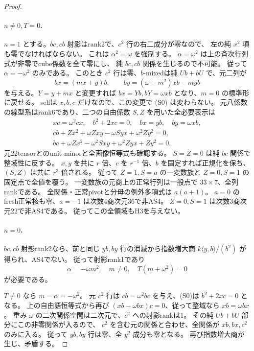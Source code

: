 \begin{proof}
\paragraph{$n\ne0,T=0$.}
$n=1$ とする。$bc,cb$ 射影はrank2で、$c^2$ 行の右二成分が零なので、
左の純 $x^2$ 項も零でなければならない。
これは $\alpha^2=\omega$ を強制する。
$\alpha=\omega^2$ は上の斉次行列式が非零でcube係数を全て零にし、
純 $bc,cb$ 関係を生じるので不可能。
従って $\alpha=-\omega^2$ のみである。
このとき $c^2$ 行は零、$b$-mixedは純 $Ub+bU$ で、元二列が
\[
 bx=(mx+y)b,\qquad by=(\omega-m^2)xb-myb
\]
を与える。$Y=y+mx$ と変更すれば $bx=Yb,bY=\omega xb$ となり、$m=0$ の標準形に戻せる。
selfは $x,b,c$ だけなので、この変更で (S0) は変わらない。
元八係数の線型系はrank6であり、二つの自由係数 $S,Z$ を用いた全必要表示は
\begin{gather*}
 xc=\omega^2cx,\quad b^2+2xc=0,\quad bx=yb,\quad by=\omega xb,\\
 cb+Zx^2+\omega Zxy-\omega S yx+\omega^2Zy^2=0,\\
 bc+\omega Zx^2-\omega^2Sxy+\omega^2Zyx+Zy^2=0.
\end{gather*}
元22tensorとのunit minorと全画像恒等式も確認する。
$S=Z=0$ は純 $bc$ 関係で整域性に反する。
$x,y$ を共に $r$ 倍、$c$ を $r^{-1}$ 倍、$b$ を固定すれば正規化を保ち、
$(S,Z)$ は共に $r^3$ 倍される。
従って $Z=1,S=a$ の一変数族と $Z=0,S=1$ の固定点で全値を覆う。
一変数族の元商上の正常行列は一般点で $33\times7$、全列rankである。
全関係・正常pivotと分母の例外多項式は $a(a+1)$。
$a=0$ のfresh正常核も零、$a=-1$ は次数4商次元36で非AS4。
$Z=0,S=1$ は次数3商次元22で非AS4である。
従ってこの全領域もH3を与えない。

\paragraph{$n=0$.}
$bc,cb$ 射影rank2なら、前と同じ $yb,by$ 行の消滅から指数増大商
$k\langle y,b\rangle/(b^2)$ が得られ、AS4でない。
従って射影rank1であり
\[
 \alpha=-\omega m^2,\quad m\ne0,\quad T(m+\omega^2)=0
\]
が必要である。

$T\ne0$ なら $m=\alpha=-\omega^2$。
元 $c^2$ 行は $cb=\omega^2bc$ を与え、(S0)は $b^2+2xc=0$ となる。
上の自由語恒等式から再び $(xb-\omega bx)c=0$、従って整域なら $xb=\omega bx$。
重み $\omega$ の二次関係空間は二次元で、$c^2$ への射影rankは1。
その純 $Ub+bU$ 部分にこの非零関係が入るので、
$c^2$ を含む元の関係と合わせ、全関係が $xb,bx,c^2$ のみに入る。
従って $yb,by$ 行は零、全 $y^2$ 成分も零となる。
再び指数増大商が生じ、矛盾する。


\end{proof}
